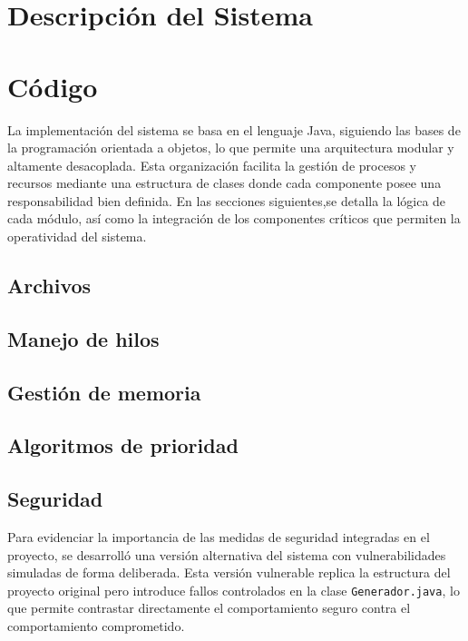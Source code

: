 \documentclass{article}
\begin{document}
\tableofcontents
\newpage

\section{Descripción del Sistema}


\section{Código}
La implementación del sistema se basa en el lenguaje Java, siguiendo las bases de la programación orientada a objetos,
lo que permite una arquitectura modular y altamente desacoplada. Esta organización facilita
la gestión de procesos y recursos mediante una estructura de clases donde cada componente posee
una responsabilidad bien definida. En las secciones siguientes,se detalla la lógica de cada módulo,
así como la integración de los componentes críticos que permiten la operatividad del sistema.
\subsection{Archivos}\label{sec:archivos}


\subsection{Manejo de hilos}\label{sec:hilos}


\subsection{Gestión de memoria}\label{sec:memoria}


\subsection{Algoritmos de prioridad}\label{sec:algoritmos}


\subsection{Seguridad}\label{sec:seguridad}
Para evidenciar la importancia de las medidas de seguridad integradas en el proyecto,
se desarrolló una versión alternativa del sistema con vulnerabilidades simuladas de forma
deliberada. Esta versión vulnerable replica la estructura del proyecto original pero introduce
fallos controlados en la clase \texttt{Generador.java}, lo que permite contrastar directamente
el comportamiento seguro contra el comportamiento comprometido.
\end{document}
